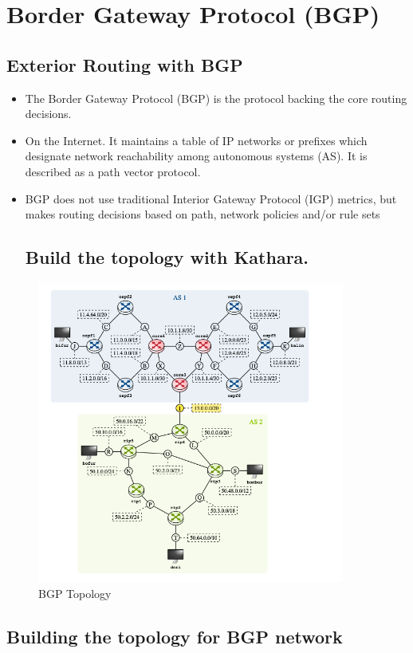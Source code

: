 \chapter{Border Gateway Protocol (BGP)}
\section{Exterior Routing with BGP}
\begin{itemize} 
\item The Border Gateway Protocol (BGP) is the protocol backing the core routing decisions.
\item On the Internet. It maintains a table of IP networks or prefixes which designate network reachability among autonomous systems (AS). It is described as a path vector protocol.
\item BGP does not use traditional Interior Gateway Protocol (IGP) metrics, but makes routing decisions based on path, network policies and/or rule sets
\section{ Build the topology with Kathara.}
\end{itemize}
\begin{figure}[H]
\centering
  \includegraphics[width=0.9\textwidth]{Images/BGP_Topology.png}
  \caption{BGP Topology}
  \label{fig }
\end{figure}
\section{Building the topology for BGP network}
